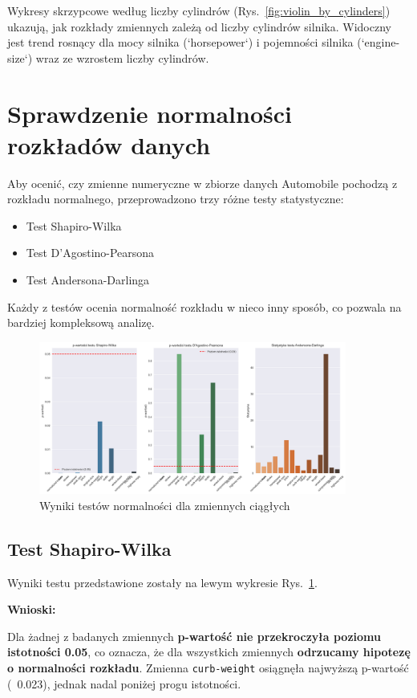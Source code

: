 \documentclass[12pt,a4paper]{article}
\begin{document}
Wykresy skrzypcowe według liczby cylindrów (Rys.~\ref{fig:violin_by_cylinders}) ukazują, jak rozkłady zmiennych zależą od liczby cylindrów silnika. Widoczny jest trend rosnący dla mocy silnika (`horsepower`) i pojemności silnika (`engine-size`) wraz ze wzrostem liczby cylindrów.

\section{Sprawdzenie normalności rozkładów danych}

Aby ocenić, czy zmienne numeryczne w zbiorze danych Automobile pochodzą z rozkładu normalnego, przeprowadzono trzy różne testy statystyczne:
\begin{itemize}
    \item Test Shapiro-Wilka
    \item Test D'Agostino-Pearsona
    \item Test Andersona-Darlinga
\end{itemize}

Każdy z testów ocenia normalność rozkładu w nieco inny sposób, co pozwala na bardziej kompleksową analizę.

\begin{figure}[H]
    \centering
    \includegraphics[width=0.9\textwidth]{figures/normality_tests.png}
    \caption{Wyniki testów normalności dla zmiennych ciągłych}
    \label{fig:normality_tests}
\end{figure}

\subsection{Test Shapiro-Wilka}

Wyniki testu przedstawione zostały na lewym wykresie Rys.~\ref{fig:normality_tests}. 

\textbf{Wnioski:}

Dla żadnej z badanych zmiennych \textbf{p-wartość nie przekroczyła poziomu istotności 0.05}, co oznacza, że dla wszystkich zmiennych \textbf{odrzucamy hipotezę o normalności rozkładu}. Zmienna \texttt{curb-weight} osiągnęła najwyższą p-wartość (~0.023), jednak nadal poniżej progu istotności.
\end{document}
